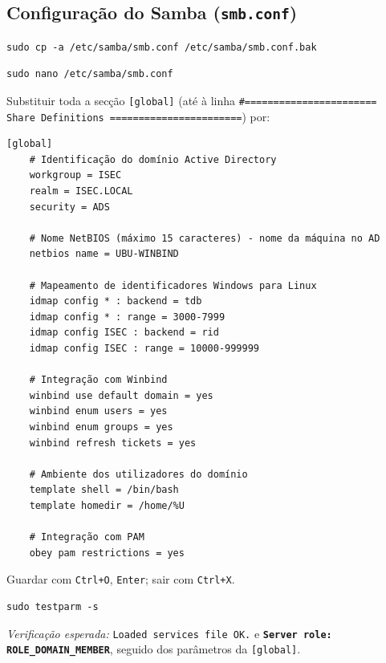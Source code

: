 
\subsection[Configuração do Samba (smb.conf)]{Configuração do Samba (\texttt{smb.conf})}


\begin{lstlisting}[style=bashstyle]
sudo cp -a /etc/samba/smb.conf /etc/samba/smb.conf.bak
\end{lstlisting}


\begin{lstlisting}[style=bashstyle]
sudo nano /etc/samba/smb.conf
\end{lstlisting}

Substituir toda a secção \texttt{[global]} (até à linha \texttt{\#======================= Share Definitions =======================}) por:

\begin{lstlisting}[style=cfgstyle]
[global]
    # Identificação do domínio Active Directory
    workgroup = ISEC
    realm = ISEC.LOCAL
    security = ADS

    # Nome NetBIOS (máximo 15 caracteres) - nome da máquina no AD
    netbios name = UBU-WINBIND

    # Mapeamento de identificadores Windows para Linux
    idmap config * : backend = tdb
    idmap config * : range = 3000-7999
    idmap config ISEC : backend = rid
    idmap config ISEC : range = 10000-999999

    # Integração com Winbind
    winbind use default domain = yes
    winbind enum users = yes
    winbind enum groups = yes
    winbind refresh tickets = yes

    # Ambiente dos utilizadores do domínio
    template shell = /bin/bash
    template homedir = /home/%U

    # Integração com PAM
    obey pam restrictions = yes
\end{lstlisting}

Guardar com \texttt{Ctrl+O}, \texttt{Enter}; sair com \texttt{Ctrl+X}.


\begin{lstlisting}[style=bashstyle]
sudo testparm -s
\end{lstlisting}

\emph{Verificação esperada:} \texttt{Loaded services file OK.} e \textbf{\texttt{Server role: ROLE\_DOMAIN\_MEMBER}}, seguido dos parâmetros da \texttt{[global]}.

